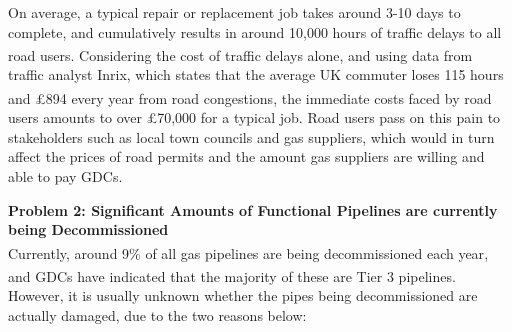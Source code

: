 \documentclass[11pt]{article}		%
\newcommand{\supercite}[1]{\textsuperscript{\cite{#1}}}		%
\begin{document}
    On average, a typical repair or replacement job takes around 3-10 days to complete, and cumulatively results in around 10,000 hours of traffic delays to all road users\supercite{pipeinspection}. Considering the cost of traffic delays alone, and using data from traffic analyst Inrix, which states that the average UK commuter loses 115 hours and £894 every year from road congestions\supercite{trafficreport}, the immediate costs faced by road users amounts to over £70,000 for a typical job. Road users pass on this pain to stakeholders such as local town councils and gas suppliers, which would in turn affect the prices of road permits and the amount gas suppliers are willing and able to pay GDCs. 
 	
    \textbf{Problem 2: Significant Amounts of Functional Pipelines are currently being Decommissioned}\\
    Currently, around 9\% of all gas pipelines are being decommissioned each year\supercite{decommission}, and GDCs have indicated that the majority of these are Tier 3 pipelines\supercite{decommission}. However, it is usually unknown whether the pipes being decommissioned are actually damaged, due to the two reasons below:
	
\end{document}
